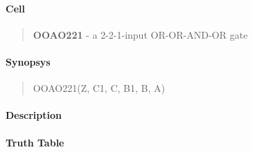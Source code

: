 \label{OOAO221}
\paragraph{Cell}
\begin{quote}
    \textbf{OOAO221} - a 2-2-1-input OR-OR-AND-OR gate
\end{quote}

\paragraph{Synopsys}
\begin{quote}
    OOAO221(Z, C1, C, B1, B, A)
\end{quote}

\paragraph{Description}

%

\paragraph{Truth Table}
%

